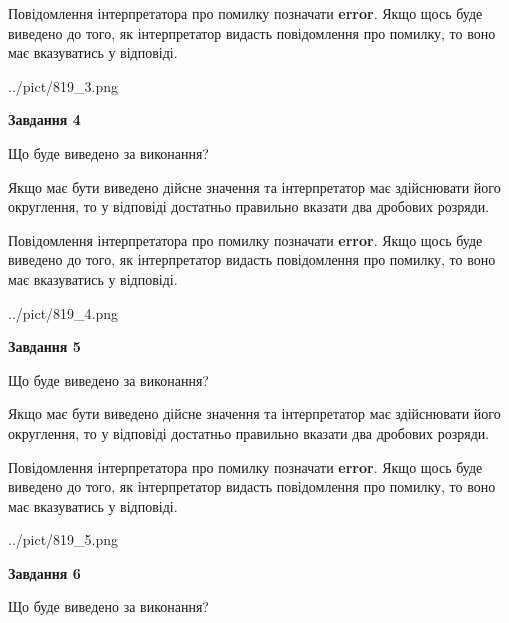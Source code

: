 \documentclass[12pt, ukrainian]{article}
\begin{document}
{\begin {Large}
Повідомлення інтерпретатора про помилку позначати \textbf{error}.
Якщо щось буде виведено до того, як інтерпретатор видасть повідомлення про помилку, 
то воно має вказуватись у відповіді. \par

\begin{center}
	{../pict/819_3.png}
\end{center}
\newpage

{\begin {center}\textbf{Завдання 4}\end {center}}\par
Що буде виведено за виконання? \par

Якщо має бути виведено дійсне значення та інтерпретатор має здійснювати його округлення, 
то у відповіді достатньо правильно вказати два дробових розряди.

Повідомлення інтерпретатора про помилку позначати \textbf{error}.
Якщо щось буде виведено до того, як інтерпретатор видасть повідомлення про помилку, 
то воно має вказуватись у відповіді. \par

\begin{center}
	{../pict/819_4.png}
\end{center}
\newpage

{\begin {center}\textbf{Завдання 5}\end {center}}\par
Що буде виведено за виконання? \par

Якщо має бути виведено дійсне значення та інтерпретатор має здійснювати його округлення, 
то у відповіді достатньо правильно вказати два дробових розряди.

Повідомлення інтерпретатора про помилку позначати \textbf{error}.
Якщо щось буде виведено до того, як інтерпретатор видасть повідомлення про помилку, 
то воно має вказуватись у відповіді. \par

\begin{center}
	{../pict/819_5.png}
\end{center}
\newpage

{\begin {center}\textbf{Завдання 6}\end {center}}\par
Що буде виведено за виконання? \par


\end{Large}}
\end{document}
